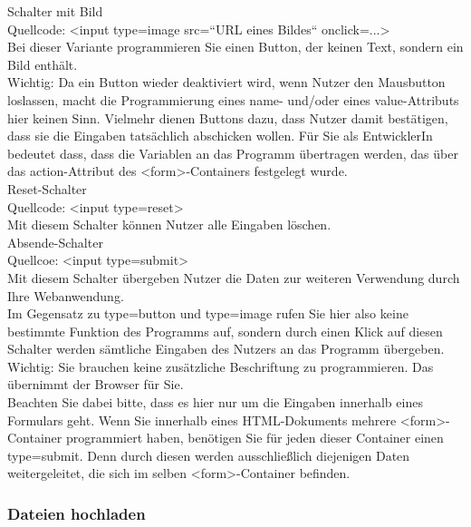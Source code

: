 Schalter mit Bild\\

Quellcode: <input type=image src=“URL eines Bildes“ onclick=...>\\

Bei dieser Variante programmieren Sie einen Button, der keinen Text, sondern ein Bild enthält.\\

Wichtig: Da ein Button wieder deaktiviert wird, wenn Nutzer den Mausbutton loslassen, macht die Programmierung eines name- und/oder eines value-Attributs hier keinen Sinn. Vielmehr dienen Buttons dazu, dass Nutzer damit bestätigen, dass sie die Eingaben tatsächlich abschicken wollen. Für Sie als EntwicklerIn bedeutet dass, dass die Variablen an das Programm übertragen werden, das über das action-Attribut des <form>-Containers festgelegt wurde.\\

Reset-Schalter\\

Quellcode: <input type=reset>\\

Mit diesem Schalter können Nutzer alle Eingaben löschen.\\

Absende-Schalter\\

Quellcoe: <input type=submit>\\

Mit diesem Schalter übergeben Nutzer die Daten zur weiteren Verwendung durch Ihre Webanwendung.\\

Im Gegensatz zu type=button und type=image rufen Sie hier also keine bestimmte Funktion des Programms auf, sondern durch einen Klick auf diesen Schalter werden sämtliche Eingaben des Nutzers an das Programm übergeben.\\

Wichtig: Sie brauchen keine zusätzliche Beschriftung zu programmieren. Das übernimmt der Browser für Sie.\\

Beachten Sie dabei bitte, dass es hier nur um die Eingaben innerhalb eines Formulars geht. Wenn Sie innerhalb eines HTML-Dokuments mehrere <form>-Container programmiert haben, benötigen Sie für jeden dieser Container einen type=submit. Denn durch diesen werden ausschließlich diejenigen Daten weitergeleitet, die sich im selben <form>-Container befinden.

\subsubsection{Dateien hochladen}

